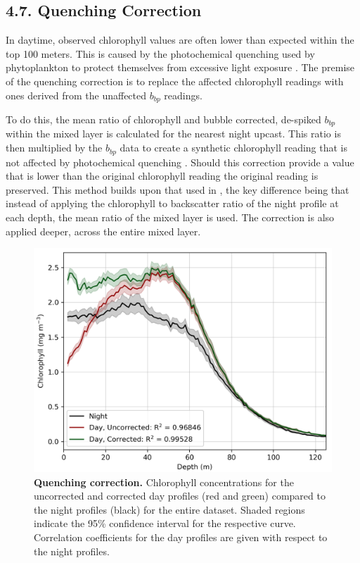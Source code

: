 \documentclass[
	a4paper, %
	10pt, %
	unnumberedsections, %
	twoside, %
]{LTJournalArticle}
\begin{document}
\begin{multicols}{2}
\subsection{4.7. Quenching Correction}
In daytime, observed chlorophyll values are often lower than expected within the top 100 meters. This is caused by the photochemical quenching
used by phytoplankton to protect themselves from excessive light exposure \citep{ref56}. The premise of the quenching correction is to replace
the affected chlorophyll readings with ones derived from the unaffected $b_{bp}$ readings.

To do this, the mean ratio of chlorophyll and bubble corrected, de-spiked $b_{bp}$ within the mixed layer is calculated for the nearest night
upcast. This ratio is then multiplied by the $b_{bp}$ data to create a synthetic chlorophyll reading that is not affected by photochemical
quenching \citep{ref43}. Should this correction provide a value that is lower than the original chlorophyll reading the original reading is
preserved. This method builds upon that used in \citet{ref43}, the key difference being that instead of applying the chlorophyll to backscatter
ratio of the night profile at each depth, the mean ratio of the mixed layer is used. The correction is also applied deeper, across the entire
mixed layer.
\begin{figure}[H] 
	\includegraphics[width=\linewidth]{Louis/figures/figureC.png}
	\caption{\textbf{Quenching correction.} Chlorophyll concentrations for the uncorrected and corrected day profiles (red and green) compared to the night profiles (black) for the entire dataset. Shaded regions indicate the 95\% confidence interval for the respective curve. Correlation coefficients for the day profiles are given with respect to the night profiles.}
	\label{fig:C}
\end{figure}


\end{multicols}
\end{document}
